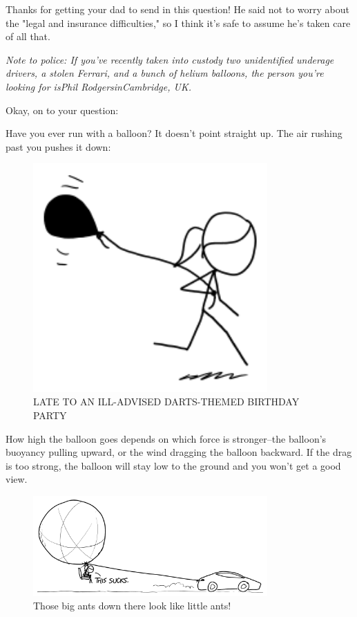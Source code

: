 {\hfill{}

{Thanks for getting your dad to send in this question! He said not to worry about the "legal and insurance difficulties," so I think it's safe to assume he's taken care of all that.}

{ \emph{Note to police: If you've recently taken into custody two unidentified underage drivers, a stolen Ferrari, and a bunch of helium balloons, the person you're looking for isPhil RodgersinCambridge, UK.} }

{Okay, on to your question:}

{Have you ever run with a balloon? It doesn't point straight up. The air rushing past you pushes it down:}

\begin{figure}[!htbp]
\centering
\includegraphics[scale=0.5, max width=0.8\textwidth]{imgs/a/112/running.png}
\caption{LATE TO AN ILL-ADVISED DARTS-THEMED BIRTHDAY PARTY}
\end{figure}

{How high the balloon goes depends on which force is stronger--the balloon's buoyancy pulling upward, or the wind dragging the balloon backward. If the drag is too strong, the balloon will stay low to the ground and you won't get a good view.}

\begin{figure}[!htbp]
\centering
\includegraphics[scale=0.5, max width=0.8\textwidth]{imgs/a/112/driving.png}
\caption{Those big ants down there look like little ants!}
\end{figure}

}
